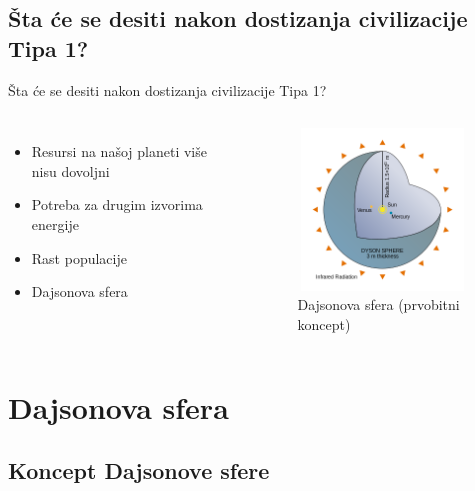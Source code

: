 \documentclass[13pt]{beamer}
\begin{document}
\subsection{Šta će se desiti nakon dostizanja civilizacije Tipa 1?}

\begin{frame}{Šta će se desiti nakon dostizanja civilizacije Tipa 1?}


\begin{columns}
        \begin{itemize}
        \item Resursi na našoj planeti više nisu dovoljni
        \item Potreba za drugim izvorima energije
        \item Rast populacije
        \item Dajsonova sfera 
        \end{itemize}
            \begin{figure}
                \centering
                \includegraphics[width=4.5cm, height=4.3cm]{images/Dajsonova sfera.png}
                \caption{Dajsonova sfera (prvobitni koncept)}
            \end{figure}
\end{columns}

\end{frame}






\section{Dajsonova sfera}

\subsection{Koncept Dajsonove sfere}
\end{document}
